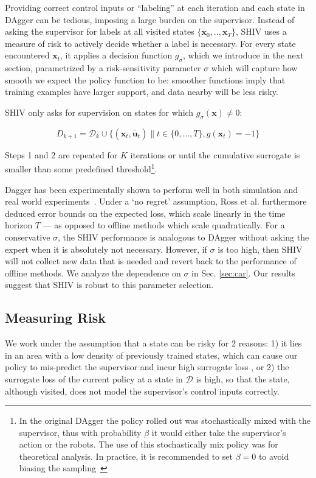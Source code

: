 \documentclass[10pt, conference]{ieeeconf}      %
\newcommand{\bu}{\mathbf{u}}
\newcommand{\bx}{\mathbf{x}}
\begin{document}
Providing correct control inputs or ``labeling'' at each
iteration and each state in DAgger can be tedious, imposing a large burden on the supervisor.
Instead of asking the supervisor for labels at all visited states $\{\bx_0,..,\bx_T\}$, SHIV uses a measure of risk to actively decide whether a label is necessary. For every state encountered $\bx_t$, it applies a decision function $g_{\sigma}$, which we introduce in the next section, parametrized by a risk-sensitivity parameter $\sigma$ which will capture how smooth we expect the policy function to be: smoother functions imply that training examples have larger support, and data nearby will be less risky.

SHIV only asks for supervision on states for which $g_{\sigma}(\bx) \neq 0$: 


$$D_{k+1}=\mathcal{D}_k \cup \{(\bx_t,\tilde{\bu_t})\|t\in\{0,\ldots,T\},g(\bx_t)=-1\}$$

Steps 1 and 2 are repeated for $K$ iterations or until 
the cumulative surrogate is smaller than some predefined threshold\footnote{In the original DAgger the policy rolled out
was stochastically mixed with the supervisor, thus with probability $\beta$ it would either take the supervisor's action
or the robots. The use of this stochastically mix policy was for theoretical analysis. In practice, it is recommended
to set $\beta = 0$ to avoid biasing the sampling~\cite{NIPS2014_5421,ross2010reduction}}.


Dagger has been experimentally shown to perform well in both simulation and real world
    experiments~\cite{NIPS2014_5421,ross2010reduction,ross2013learning}. Under a `no regret' assumption, Ross et al.\cite{ross2010reduction} furthermore
deduced error bounds on the expected loss, which scale linearly in the time horizon $T$ --- as opposed to offline methods which scale quadratically. For a conservative $\sigma$, the SHIV performance is analogous to DAgger without asking the expert when it is absolutely not necessary. However, if $\sigma$ is too high, then SHIV will not collect new data that is needed and revert back to the performance of offline methods. We analyze the dependence on $\sigma$ in Sec. \ref{sec:car}. Our results suggest that SHIV is robust to this parameter selection. 

\subsection{Measuring Risk}
We work under the assumption that a state can be risky for 2 reasons: 1) it lies in an area with a low density of
previously trained states, which can cause our policy to mis-predict the supervisor and incur high surrogate
loss \cite{tokdar2010importance}, or 2) the surrogate loss of the current policy at a state in $\mathcal{D}$ is high, so that the state, although visited, does
not model the supervisor's control inputs correctly. 
\end{document}
